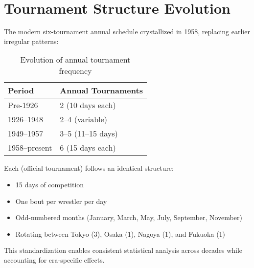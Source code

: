 \section{Tournament Structure Evolution}

The modern six-tournament annual schedule crystallized in 1958, replacing earlier irregular patterns:

\begin{table}[h]
\centering
\begin{tabular}{ll}
\toprule
Period & Annual Tournaments \\
\midrule
Pre-1926 & 2 (10 days each) \\
1926--1948 & 2--4 (variable) \\
1949--1957 & 3--5 (11--15 days) \\
1958--present & 6 (15 days each) \\
\bottomrule
\end{tabular}
\caption{Evolution of annual tournament frequency}
\end{table}

Each  (official tournament) follows an identical structure:
\begin{itemize}
\item 15 days of competition
\item One bout per wrestler per day
\item Odd-numbered months (January, March, May, July, September, November)
\item Rotating between Tokyo (3), Osaka (1), Nagoya (1), and Fukuoka (1)
\end{itemize}

This standardization enables consistent statistical analysis across decades while accounting for era-specific effects.